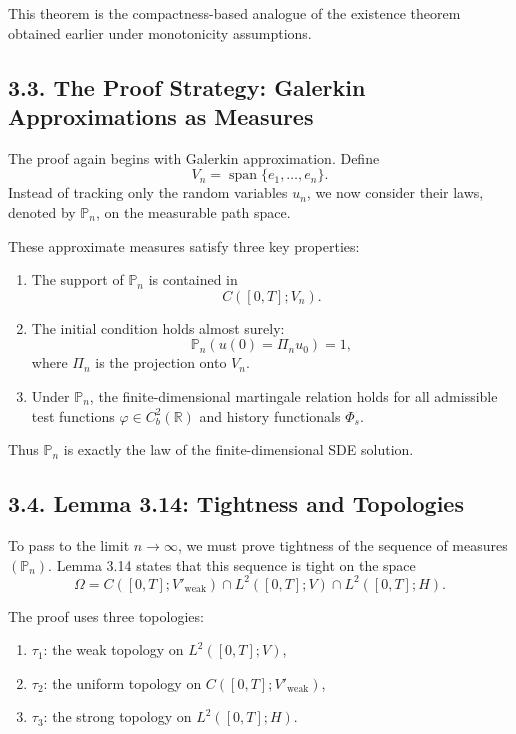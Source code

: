 \documentclass[11pt]{article}
\theoremstyle{definition}
\theoremstyle{remark}
\begin{document}
This theorem is the compactness-based analogue of the existence theorem obtained earlier under monotonicity assumptions.

\subsection*{3.3. The Proof Strategy: Galerkin Approximations as Measures}
The proof again begins with Galerkin approximation. Define
\[
V_n=\operatorname{span}\{e_1,\dots,e_n\}.
\]
Instead of tracking only the random variables \(u_n\), we now consider their laws, denoted by \(\mathbb P_n\), on the measurable path space.

These approximate measures satisfy three key properties:
\begin{enumerate}
\item The support of \(\mathbb P_n\) is contained in
\[
C([0,T];V_n).
\]

\item The initial condition holds almost surely:
\[
\mathbb P_n(u(0)=\Pi_n u_0)=1,
\]
where \(\Pi_n\) is the projection onto \(V_n\).

\item Under \(\mathbb P_n\), the finite-dimensional martingale relation holds for all admissible test functions \(\varphi\in C_b^2(\mathbb R)\) and history functionals \(\Phi_s\).
\end{enumerate}

Thus \(\mathbb P_n\) is exactly the law of the finite-dimensional SDE solution.

\subsection*{3.4. Lemma 3.14: Tightness and Topologies}
To pass to the limit \(n\to\infty\), we must prove tightness of the sequence of measures \((\mathbb P_n)\). Lemma 3.14 states that this sequence is tight on the space
\[
\Omega
=
C([0,T];V'_{\mathrm{weak}})
\cap
L^2([0,T];V)
\cap
L^2([0,T];H).
\]

The proof uses three topologies:
\begin{enumerate}
\item \(\tau_1\): the weak topology on \(L^2([0,T];V)\),
\item \(\tau_2\): the uniform topology on \(C([0,T];V'_{\mathrm{weak}})\),
\item \(\tau_3\): the strong topology on \(L^2([0,T];H)\).
\end{enumerate}
\end{document}
